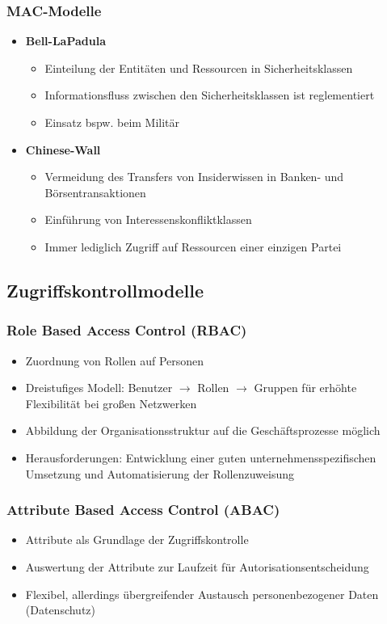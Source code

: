 \subsubsection{MAC-Modelle}
\begin{itemize}
	\item \textbf{Bell-LaPadula}
	\begin{itemize}
		\item Einteilung der Entitäten und Ressourcen in Sicherheitsklassen
		\item Informationsfluss zwischen den Sicherheitsklassen ist reglementiert
		\item Einsatz bspw. beim Militär
	\end{itemize}
	\item \textbf{Chinese-Wall}
	\begin{itemize}
		\item Vermeidung des Transfers von Insiderwissen in Banken- und Börsentransaktionen
		\item Einführung von Interessenskonfliktklassen
		\item Immer lediglich Zugriff auf Ressourcen einer einzigen Partei
	\end{itemize}
\end{itemize}


\subsection{Zugriffskontrollmodelle}

\subsubsection{Role Based Access Control (RBAC)}
\begin{itemize}
	\item Zuordnung von Rollen auf Personen
	\item Dreistufiges Modell: Benutzer $\rightarrow$ Rollen $\rightarrow$ Gruppen für erhöhte Flexibilität bei großen Netzwerken
	\item Abbildung der Organisationsstruktur auf die Geschäftsprozesse möglich
	\item Herausforderungen: Entwicklung einer guten unternehmensspezifischen Umsetzung und Automatisierung der Rollenzuweisung
\end{itemize}

\subsubsection{Attribute Based Access Control (ABAC)}
\begin{itemize}
	\item Attribute als Grundlage der Zugriffskontrolle
	\item Auswertung der Attribute zur Laufzeit für Autorisationsentscheidung
	\item Flexibel, allerdings übergreifender Austausch personenbezogener Daten (Datenschutz)
\end{itemize}

